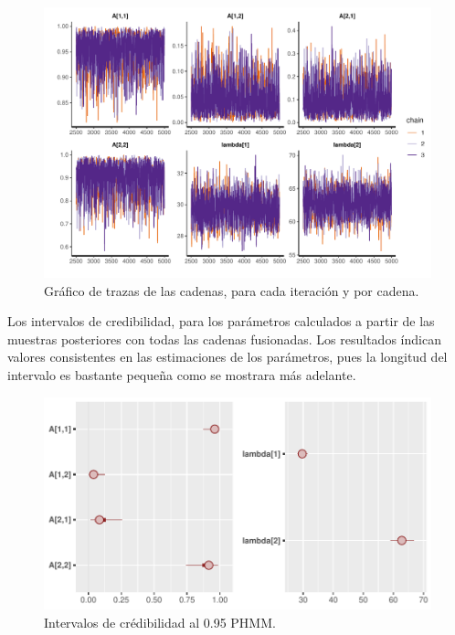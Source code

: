 \documentclass[a4paper]{article}\usepackage[]{graphicx}\usepackage[]{color}
\makeatletter
\def\maxwidth{ %
  \ifdim\Gin@nat@width>\linewidth
    \linewidth
  \else
    \Gin@nat@width
  \fi
}
\newenvironment{knitrout}{}{} %
\makeatother
\begin{document}
\begin{knitrout}
\color{fgcolor}\begin{figure}[h]
\includegraphics[width=\maxwidth]{figure/unnamed-chunk-30-1} \caption[Gráfico de trazas de las cadenas, para cada iteración y por cadena]{Gráfico de trazas de las cadenas, para cada iteración y por cadena.}\label{fig:unnamed-chunk-30}
\end{figure}


\end{knitrout}
                              
Los intervalos de credibilidad, para los parámetros calculados a partir de las muestras posteriores con todas las cadenas fusionadas. Los resultados índican valores consistentes en las estimaciones de los parámetros, pues la longitud del intervalo es bastante pequeña como se mostrara más adelante.

\begin{knitrout}
\color{fgcolor}\begin{figure}
\includegraphics[width=\maxwidth]{figure/unnamed-chunk-31-1} \caption[Intervalos de crédibilidad al 0.95 PHMM]{Intervalos de crédibilidad al 0.95 PHMM.}\label{fig:unnamed-chunk-31}
\end{figure}


\end{knitrout}
\end{document}

